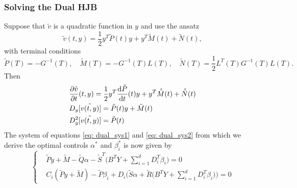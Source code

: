 \subsubsection{Solving the Dual HJB}
Suppose that $\tilde{v}$ is a quadratic function in $y$ and use the ansatz
\begin{equation}
    \tilde{v}(t,y) = \frac12 y^T \tilde{P}(t) y + y^T \tilde{M}(t) + \tilde{N}(t),
\end{equation}
with terminal conditions
\begin{equation}
    \tilde{P}(T) = -G^{-1}(T), \quad \tilde{M}(T) = - G^{-1}(T)L(T), \quad \tilde{N}(T) = \frac12 L^T(T)G^{-1}(T)L(T). \label{eq: dual_terminal_conditions}
\end{equation}
Then
\begin{align*}
    &\frac{\partial \tilde{v}}{\partial t}(t, y) = \frac12 y^T \frac{\mathrm{d} \tilde{P}}{\mathrm{d} t}(t) y + y^T \dot{\tilde{M}}(t) + \dot{\tilde{N}}(t)\\
    &D_y[\tilde{v(t,y)}] = \tilde{P}(t) y + \tilde{M}(t)\\
    &D_y^2[\tilde{v(t,y)}] = \tilde{P}(t)
\end{align*}
The system of equations \eqref{eq: dual_sys1} and \eqref{eq: dual_sys2} from which we derive the optimal controls $\alpha^\ast$ and $\beta_i^\ast$ is now given by 
\begin{equation}
\begin{cases}
    &\tilde{P}y + \tilde{M} - \tilde{Q}\alpha - \tilde{S}^T \bigg(B^T Y + \sum_{i=1}^d D_i^T \beta_i\bigg) = 0\\
    &C_i (\tilde{P}y + \tilde{M}) - \tilde{P} \beta_i
    + D_i \bigg(\tilde{S}\alpha + \tilde{R}\bigg(B^T Y + \sum_{i=1}^d D_i^T \beta_i\bigg)\bigg) = 0
\end{cases} \label{eq: dual_hjb_system_controls}
\end{equation}

